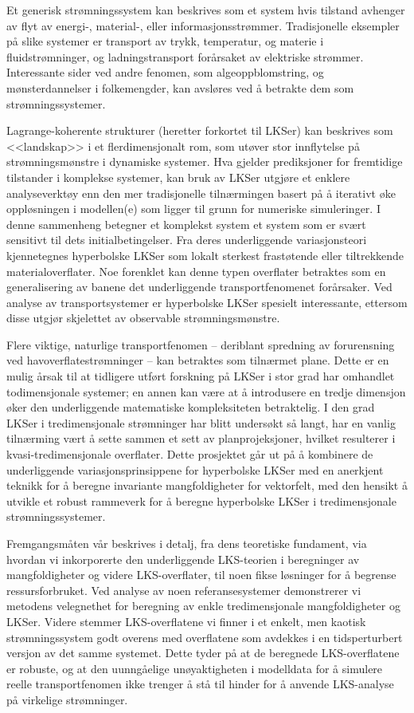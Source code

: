 \begingroup
\vspace{3mm}
Et generisk strømningssystem kan beskrives som et system hvis tilstand avhenger
av flyt av energi-, material-, eller informasjonsstrømmer. Tradisjonelle
eksempler på slike systemer er transport av trykk, temperatur, og materie i
fluidstrømninger, og ladningstransport forårsaket av elektriske strømmer.
Interessante sider ved andre fenomen, som algeoppblomstring, og
mønsterdannelser i folkemengder, kan avsløres ved å betrakte dem som
strømningssystemer.

Lagrange-koherente strukturer (heretter forkortet til LKSer) kan beskrives som
<<landskap>> i et flerdimensjonalt rom, som utøver stor innflytelse på
strømningsmønstre i dynamiske systemer. Hva gjelder prediksjoner for fremtidige
tilstander i komplekse systemer, kan bruk av LKSer utgjøre et enklere
analyseverktøy enn den mer tradisjonelle tilnærmingen basert på å
iterativt øke oppløsningen i modellen(e) som ligger til grunn for numeriske
simuleringer. I denne sammenheng betegner et komplekst system et system som er
svært sensitivt til dets initialbetingelser. Fra deres underliggende
variasjonsteori kjennetegnes hyperbolske LKSer som lokalt sterkest frastøtende
eller tiltrekkende materialoverflater. Noe forenklet kan denne typen overflater
betraktes som en generalisering av banene det underliggende transportfenomenet
forårsaker. Ved analyse av transportsystemer er hyperbolske LKSer spesielt
interessante, ettersom disse utgjør skjelettet av observable strømningsmønstre.

Flere viktige, naturlige transportfenomen -- deriblant spredning av
forurensning ved havoverflatestrømninger -- kan betraktes som tilnærmet plane.
Dette er en mulig årsak til at tidligere utført forskning på LKSer i stor grad
har omhandlet todimensjonale systemer; en annen kan være at å introdusere en
tredje dimensjon øker den underliggende matematiske kompleksiteten betraktelig.
I den grad LKSer i tredimensjonale strømninger har blitt undersøkt så langt,
har en vanlig tilnærming vært å sette sammen et sett av planprojeksjoner,
hvilket resulterer i kvasi-tredimensjonale overflater. Dette prosjektet går ut
på å kombinere de underliggende variasjonsprinsippene for hyperbolske LKSer med
en anerkjent teknikk for å beregne invariante mangfoldigheter for vektorfelt,
med den hensikt å utvikle et robust rammeverk for å beregne hyperbolske LKSer i
tredimensjonale strømningssystemer.

Fremgangsmåten vår beskrives i detalj, fra dens teoretiske fundament, via
hvordan vi inkorporerte den underliggende LKS-teorien i beregninger av
mangfoldigheter og videre LKS-overflater, til noen fikse løsninger for å
begrense ressursforbruket. Ved analyse av noen referansesystemer demonstrerer
vi metodens velegnethet for beregning av enkle tredimensjonale mangfoldigheter
og LKSer. Videre stemmer LKS-overflatene vi finner i et enkelt, men kaotisk
strømningssystem godt overens med overflatene som avdekkes i en tidsperturbert
versjon av det samme systemet. Dette tyder på at de beregnede LKS-overflatene
er robuste, og at den uunngåelige unøyaktigheten i modelldata for å simulere
reelle transportfenomen ikke trenger å stå til hinder for å anvende LKS-analyse
på virkelige strømninger.

